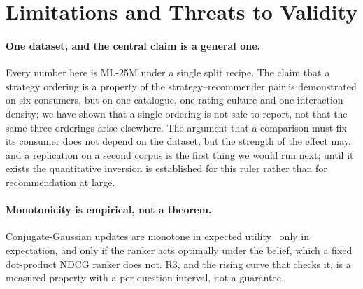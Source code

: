 \documentclass[manuscript,screen]{acmart}
\begin{document}
\section{Limitations and Threats to Validity}\label{sec:limits}

\paragraph{One dataset, and the central claim is a general one.} Every number here is ML-25M under a single split recipe. The claim that a strategy ordering is a property of the strategy--recommender pair is demonstrated on six consumers, but on one catalogue, one rating culture and one interaction density; we have shown that a single ordering is not safe to report, not that the same three orderings arise elsewhere. The argument that a comparison must fix its consumer does not depend on the dataset, but the strength of the effect may, and a replication on a second corpus is the first thing we would run next; until it exists the quantitative inversion is established for this ruler rather than for recommendation at large.

\paragraph{Monotonicity is empirical, not a theorem.} Conjugate-Gaussian updates are monotone in expected utility~\citep{good1967principle,blackwell1953equivalent} only in expectation, and only if the ranker acts optimally under the belief, which a fixed dot-product NDCG ranker does not. R3, and the rising curve that checks it, is a measured property with a per-question interval, not a guarantee.
\end{document}

